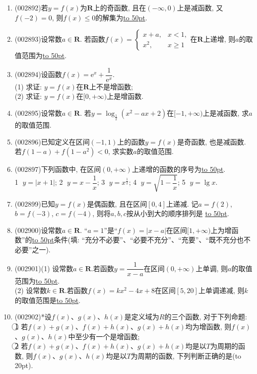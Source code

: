 \documentclass[10pt,a4paper]{article}
\newcommand{\blank}[1]{\underline{\hbox to #1pt{}}}
\newcommand{\bracket}[1]{(\hbox to #1pt{})}
\begin{document}
\begin{enumerate}[1.]
\item {\tiny (002892)}若$y=f(x)$为$\mathbf{R}$上的奇函数, 且在$(-\infty,0)$上是减函数, 又$f(-2)=0$, 则$f(x)\le 0$的解集为\blank{50}.
\item {\tiny (002893)}设常数$a\in \mathbf{R}$. 若函数$f(x)=\begin{cases} x+a,& x<1, \\ x^2,& x\ge 1 \end{cases}$在$\mathbf{R}$上递增, 则$a$的取值范围为\blank{50}.
\item {\tiny (002894)}设函数$f(x)=\mathrm{e}^x+\dfrac 1{\mathrm{e}^x}$.\\
(1) 求证: $y=f(x)$在$\mathbf{R}$上不是增函数;\\
(2) 求证: $y=f(x)$在$[0,+\infty)$上是增函数.
\item {\tiny (002895)}设常数$a\in \mathbf{R}$. 若$y=\log_{\frac 12}(x^2-ax+2)$在$[-1,+\infty)$上是减函数, 求$a$的取值范围.
\item {\tiny (002896)}已知定义在区间$(-1,1)$上的函数$y=f(x)$是奇函数, 也是减函数. 若$f(1-a)+f(1-a^2)<0$, 求实数$a$的取值范围.
\item {\tiny (002897)}下列函数中, 在区间$(0 ,+\infty)$上递增的函数的序号为\blank{50}.\\
\textcircled{1} $y=|x+1|$;  \textcircled{2} $y=x-\dfrac 1x$;    \textcircled{3} $y={x^{\frac 12}}$;    \textcircled{4} $y=\sqrt{1-\dfrac 1x}$; \textcircled{5} $y=\lg x$.
\item {\tiny (002899)}已知$y=f(x)$是偶函数, 且在区间$[0,4]$上递减. 记$a=f(2)$, $b=f(-3)$, $c=f(-4)$, 则将$a,b,c$按从小到大的顺序排列是	\blank{50}.
\item {\tiny (002900)}设常数$a\in \mathbf{R}$. ``$a=1$''是``$f(x)=|x-a|$在区间$[1, +\infty)$上为增函数''的\blank{50}条件(填: ``充分不必要''、``必要不充分''、``充要''、``既不充分也不必要''之一).
\item {\tiny (002901)}(1) 设常数$a\in \mathbf{R}$.若函数$y=\dfrac 1{x-a}$在区间$(0,+\infty)$上单调, 则$a$的取值范围为\blank{50}.\\
(2) 设常数$k\in \mathbf{R}$.若函数$f(x)=kx^2-4x+8$在区间$[5,20]$上单调递减, 则$k$的取值范围是\blank{50}.
\item {\tiny (002902)}*设$f(x)$、$g(x)$、$h(x)$是定义域为$R$的三个函数, 对于下列命题:\\
\textcircled{1} 若$f(x)+g(x)$、$f(x)+h(x)$、$g(x)+h(x)$均为增函数, 则$f(x)$、$g(x)$、$h(x)$中至少有一个是增函数;\\
\textcircled{2} 若$f(x)+g(x)$、$f(x)+h(x)$、$g(x)+h(x)$均是以$T$为周期的函数, 则$f(x)$、$g(x)$、$h(x)$均是以$T$为周期的函数, 下列判断正确的是\bracket{20}.

\end{enumerate}
\end{document}
